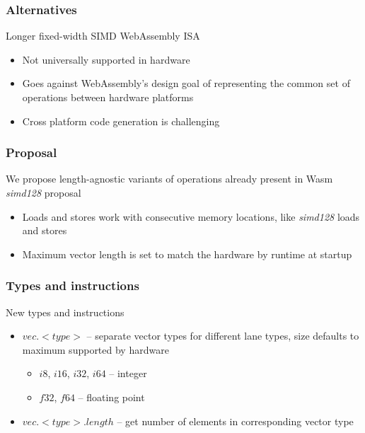 \documentclass[t,aspectratio=169, xcolor={table}]{beamer}
\begin{document}
\begin{frame}
\frametitle{Alternatives}
  Longer fixed-width SIMD WebAssembly ISA
  \begin{itemize}
  \item Not universally supported in hardware
  \item Goes against WebAssembly's design goal of representing the common set of operations between hardware platforms
  \item Cross platform code generation is challenging
  \end{itemize}
\end{frame}
\begin{frame}
\frametitle{Proposal}
  We propose length-agnostic variants of operations already present in Wasm \textit{simd128} proposal
  \begin{itemize}
  \item Loads and stores work with consecutive memory locations, like \textit{simd128} loads and stores
  \item Maximum vector length is set to match the hardware by runtime at startup
  \end{itemize}
\end{frame}
%
\begin{frame}
\frametitle{Types and instructions}
New types and instructions
  \begin{itemize}
  \item $vec.<type>$ -- separate vector types for different lane types, size defaults to maximum supported by hardware
    \begin{itemize}
    \item $i8$, $i16$, $i32$, $i64$ -- integer
    \item $f32$, $f64$ -- floating point
    \end{itemize}
  \item $vec.<type>.length$ -- get number of elements in corresponding vector type
  \end{itemize}
\end{frame}
\end{document}

